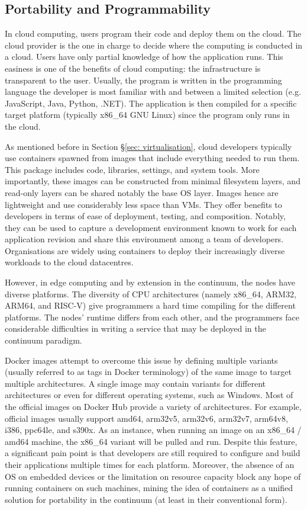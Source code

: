 \subsection{Portability and Programmability}

In cloud computing, users program their code and deploy them on the cloud. The cloud provider is the one in charge to decide where the computing is conducted in a cloud. Users have only partial knowledge of how the application runs. This easiness is one of the benefits of cloud computing: the infrastructure is transparent to the user. Usually, the program is written in the programming language the developer is most familiar with and between a limited selection (e.g. JavaScript, Java, Python, .NET). The application is then compiled for a specific target platform (typically x86\_64 GNU Linux) since the program only runs in the cloud.

As mentioned before in Section §\ref{sec: virtualisation}, cloud developers typically use containers spawned from images that include everything needed to run them. This package includes code, libraries, settings, and system tools. More importantly, these images can be constructed from minimal filesystem layers, and read-only layers can be shared notably the base OS layer. Images hence are lightweight and use considerably less space than VMs. They offer benefits to developers in terms of ease of deployment, testing, and composition. Notably, they can be used to capture a development environment known to work for each application revision and share this environment among a team of developers. Organisations are widely using containers to deploy their increasingly diverse workloads to the cloud datacentres.

However, in edge computing and by extension in the continuum, the nodes have diverse platforms. The diversity of CPU architectures (namely x86\_64, ARM32, ARM64, and RISC-V) give programmers a hard time compiling for the different platforms. The nodes' runtime differs from each other, and the programmers face considerable difficulties in writing a service that may be deployed in the continuum paradigm.

Docker images attempt to overcome this issue by defining multiple variants (usually referred to as tags in Docker terminology) of the same image to target multiple architectures. A single image may contain variants for different architectures or even for different operating systems, such as Windows. Most of the official images on Docker Hub \cite{docker-hub} provide a variety of architectures. For example, official images usually support amd64, arm32v5, arm32v6, arm32v7, arm64v8, i386, ppc64le, and s390x. As an instance, when running an image on an x86\_64 / amd64 machine, the x86\_64 variant will be pulled and run. Despite this feature, a significant pain point is that developers are still required to configure and build their applications multiple times for each platform. Moreover, the absence of an OS on embedded devices or the limitation on resource capacity block any hope of running containers on such machines, mining the idea of containers as a unified solution for portability in the continuum (at least in their conventional form).

